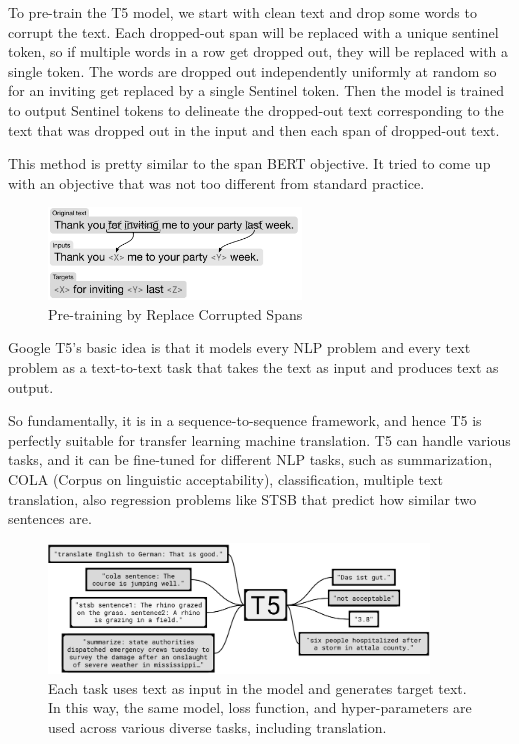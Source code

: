 To pre-train the T5 model, we start with clean text and drop some words to corrupt the text. Each dropped-out span will be replaced with a unique sentinel token, so if multiple words in a row get dropped out, they will be replaced with a single token. The words are dropped out independently uniformly at random so for an inviting get replaced by a single Sentinel token. Then the model is trained to output Sentinel tokens to delineate the dropped-out text corresponding to the text that was dropped out in the input and then each span of dropped-out text.

This method is pretty similar to the span BERT objective. It tried to come up with an objective that was not too different from standard practice.

\begin{figure}[h]
    \centering
    \includegraphics[width=0.6\textwidth]{pics/picard/t5-fine.png}
    \caption{Pre-training by Replace Corrupted Spans \cite{raffel_exploring_2020}}
\end{figure}

Google T5's basic idea is that it models every NLP problem and every text problem as a text-to-text task that takes the text as input and produces text as output.

So fundamentally, it is in a sequence-to-sequence framework, and hence T5 is perfectly suitable for transfer learning machine translation.
T5 can handle various tasks, and it can be fine-tuned for different NLP tasks, such as summarization, COLA (Corpus on linguistic acceptability), classification, multiple text translation, also regression problems like STSB  that predict how similar two sentences are.

\begin{figure}[h]
    \centering
    \includegraphics[width=0.9\textwidth]{pics/picard/t5-task.png}
    \caption{Each task uses text as input in the model and generates target text. In this way, the same model, loss function, and hyper-parameters are used across various diverse tasks, including translation. \cite{raffel_exploring_2020}}
\end{figure}

